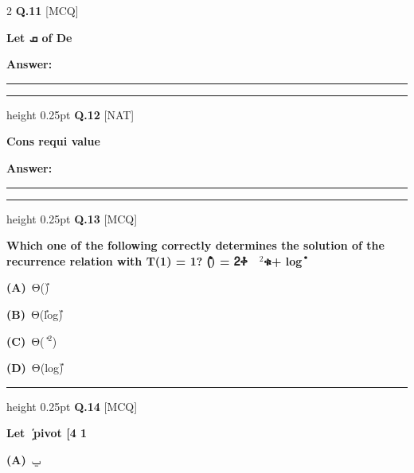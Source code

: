 \documentclass[a4paper,10pt,twoside]{article}
\begin{document}
\begin{multicols}{2}
\noindent\textbf{Q.11} \hfill {\footnotesize\textsf{[MCQ]}}
\par\vspace{2pt}
{\bfseries Let ܩ
of De \par}
\par\vspace{3pt}\noindent\textbf{Answer:} \rule{3.2cm}{0.4pt}
\par\vspace{6pt}\hrule height 0.25pt\vspace{6pt}
\noindent\textbf{Q.12} \hfill {\footnotesize\textsf{[NAT]}}
\par\vspace{2pt}
{\bfseries Cons
requi
value \par}
\par\vspace{3pt}\noindent\textbf{Answer:} \rule{3.2cm}{0.4pt}
\par\vspace{6pt}\hrule height 0.25pt\vspace{6pt}
\noindent\textbf{Q.13} \hfill {\footnotesize\textsf{[MCQ]}}
\par\vspace{2pt}
{\bfseries Which one of the following correctly determines the solution of the recurrence relation with
T(1) = 1?
ܶ(݊) = 2ܶቀ
௡
$^2$ቁ+ log݊ \par}
\par\vspace{2pt}\noindent
\textbf{(A)}~Θ(݊)\par\vspace{2pt}\noindent
\textbf{(B)}~Θ(݊log݊)\par\vspace{2pt}\noindent
\textbf{(C)}~Θ(݊ \newline $^2$)\par\vspace{2pt}\noindent
\textbf{(D)}~Θ(log݊)
\par\vspace{6pt}\hrule height 0.25pt\vspace{6pt}
\noindent\textbf{Q.14} \hfill {\footnotesize\textsf{[MCQ]}}
\par\vspace{2pt}
{\bfseries Let ܲ
pivot
[4 1 \par}
\par\vspace{2pt}\noindent
\textbf{(A)}~ݐ\par\vspace{2pt}\noindent

\end{multicols}
\end{document}
